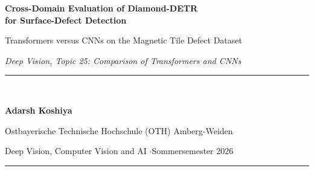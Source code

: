 \documentclass[11pt,a4paper]{article}
\begin{document}
\begin{titlepage}
\centering
\vspace*{1.2cm}
{\LARGE\bfseries\color{NavyBlue} Cross-Domain Evaluation of Diamond-DETR\\[0.3cm]
for Surface-Defect Detection\par}
\vspace{0.5cm}
{\large Transformers versus CNNs on the Magnetic Tile Defect Dataset\par}
\vspace{0.3cm}
{\large\itshape Deep Vision, Topic 25: Comparison of Transformers and CNNs\par}
\vspace{1.4cm}
\rule{0.7\textwidth}{0.5pt}\\[0.5cm]
{\large\bfseries Adarsh Koshiya\par}
\vspace{0.2cm}
{Ostbayerische Technische Hochschule (OTH) Amberg-Weiden\par}
{Deep Vision, Computer Vision and AI \quad$\cdot$\quad Sommersemester 2026\par}
\vspace{0.4cm}
\rule{0.7\textwidth}{0.5pt}\\[1.0cm]


\end{titlepage}
\end{document}
